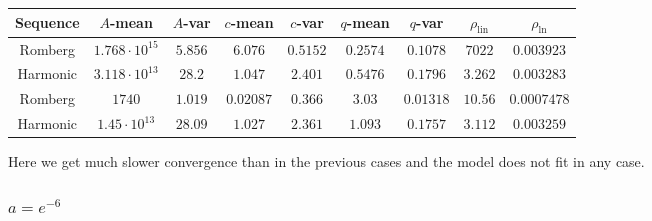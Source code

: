 \begin{table}[H]
    \centering
    \small
    \begin{tabular}{c||c|c|c|c|c|c|c|c}
Sequence & \(A\)-mean & \(A\)-var & \(c\)-mean & \(c\)-var & \(q\)-mean & \(q\)-var & \(\rho_{\operatorname{lin}}\) & \(\rho_{\ln}\)\\\hline
\rowcolor{red}
Romberg & \(1.768\cdot 10^{15}\) & \(5.856\) & \(6.076\) & \(0.5152\) & \(0.2574\) & \(0.1078\) & \(7022\) & \(0.003923\) \\
\rowcolor{red}
Harmonic & \(3.118\cdot 10^{13}\) & \(28.2\) & \(1.047\) & \(2.401\) & \(0.5476\) & \(0.1796\) & \(3.262\) & \(0.003283\) \\
\rowcolor{red}
Romberg & \(1740\) & \(1.019\) & \(0.02087\) & \(0.366\) & \(3.03\) & \(0.01318\) & \(10.56\) & \(0.0007478\) \\
\rowcolor{red}
Harmonic & \(1.45\cdot 10^{13}\) & \(28.09\) & \(1.027\) & \(2.361\) & \(1.093\) & \(0.1757\) & \(3.112\) & \(0.003259\) \\
    \end{tabular}
    \label{tab:my_label}
\end{table}

Here we get much slower convergence than in the previous cases and the model does not fit in any case.

\subsubsection{\(a = e^{-6}\)}


